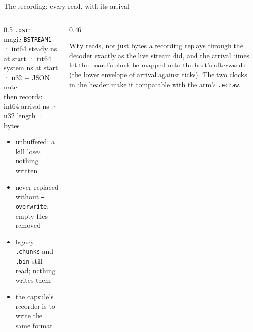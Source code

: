 \documentclass[aspectratio=169,11pt]{beamer}
\begin{document}
\begin{frame}[fragile]{The recording: every read, with its arrival}
  \begin{columns}[T]
    \begin{column}{0.5\textwidth}
      \footnotesize
      \texttt{.bsr}: \\
      magic \texttt{BSTREAM1} · int64 steady ns at start · int64 system ns at start · u32 + JSON note \\
      then records: int64 arrival ns · u32 length · bytes
      \vspace{2mm}
      \begin{itemize}
        \item unbuffered: a kill loses nothing written
        \item never replaced without \texttt{--overwrite}; empty files removed
        \item legacy \texttt{.chunks} and \texttt{.bin} still read; nothing writes them
        \item the capsule's recorder is to write the same format
      \end{itemize}
    \end{column}
    \begin{column}{0.46\textwidth}
      \begin{block}{Why reads, not just bytes}
        a recording replays through the decoder exactly as the live stream did, and the arrival times let the board's clock be mapped onto the host's afterwards (the lower envelope of arrival against ticks). The two clocks in the header make it comparable with the arm's \texttt{.ecraw}.
      \end{block}
    \end{column}
  \end{columns}
\end{frame}
\end{document}
